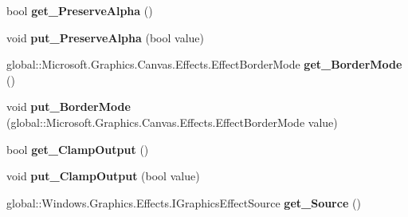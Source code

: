 \begin{DoxyCompactItemize}
\item 
\mbox{\label{class_microsoft_1_1_graphics_1_1_canvas_1_1_effects_1_1_convolve_matrix_effect_a6c45f03f2bdf0174e804e97ef308a43c}} 
bool {\bfseries get\+\_\+\+Preserve\+Alpha} ()
\item 
\mbox{\label{class_microsoft_1_1_graphics_1_1_canvas_1_1_effects_1_1_convolve_matrix_effect_a7ff28376e85f7e4262710a6e5364f86b}} 
void {\bfseries put\+\_\+\+Preserve\+Alpha} (bool value)
\item 
\mbox{\label{class_microsoft_1_1_graphics_1_1_canvas_1_1_effects_1_1_convolve_matrix_effect_adbefe36f124d91b48f6852745d9d9481}} 
global\+::\+Microsoft.\+Graphics.\+Canvas.\+Effects.\+Effect\+Border\+Mode {\bfseries get\+\_\+\+Border\+Mode} ()
\item 
\mbox{\label{class_microsoft_1_1_graphics_1_1_canvas_1_1_effects_1_1_convolve_matrix_effect_ace47dc75de05d5c68030464a1c59cada}} 
void {\bfseries put\+\_\+\+Border\+Mode} (global\+::\+Microsoft.\+Graphics.\+Canvas.\+Effects.\+Effect\+Border\+Mode value)
\item 
\mbox{\label{class_microsoft_1_1_graphics_1_1_canvas_1_1_effects_1_1_convolve_matrix_effect_a0f7dfb640c60f46c101101863ff9ee62}} 
bool {\bfseries get\+\_\+\+Clamp\+Output} ()
\item 
\mbox{\label{class_microsoft_1_1_graphics_1_1_canvas_1_1_effects_1_1_convolve_matrix_effect_a290fd5239a39bf63799d62e94e50f048}} 
void {\bfseries put\+\_\+\+Clamp\+Output} (bool value)
\item 
\mbox{\label{class_microsoft_1_1_graphics_1_1_canvas_1_1_effects_1_1_convolve_matrix_effect_a36fb9181bea0b36c84ceb83484bd971a}} 
global\+::\+Windows.\+Graphics.\+Effects.\+I\+Graphics\+Effect\+Source {\bfseries get\+\_\+\+Source} ()

\end{DoxyCompactItemize}
